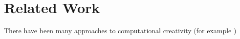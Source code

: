 \section{Related Work}

There have been many approaches to computational creativity (for example ) %

